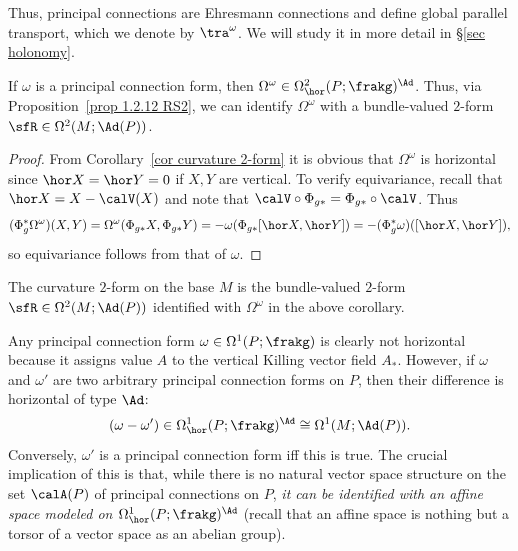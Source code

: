 Thus, principal connections are Ehresmann connections and define global parallel transport, which we denote by $\tra^\omega$. We will study it in more detail in \S\ref{sec holonomy}.


\begin{cor}
    If $\omega$ is a principal connection form, then $\Omega^\omega\in \Omega^2_{\hor}(P;\frakg)^\Ad$. Thus, via Proposition~\ref{prop 1.2.12 RS2}, we can identify $\Omega^\omega$ with a bundle-valued $2$-form $\sfR\in\Omega^2(M;\Ad(P))$.
\end{cor}
\begin{proof}
    From Corollary~\ref{cor curvature 2-form} it is obvious that $\Omega^\omega$ is horizontal since $\hor X=\hor Y=0$ if $X,Y$ are vertical. To verify equivariance, recall that $\hor X=X-\calV(X)$ and note that $\calV\circ \Phi_{g\ast}=\Phi_{g\ast}\circ \calV$. Thus 
    \[(\Phi_{g}^\ast\Omega^\omega)(X,Y)=\Omega^\omega(\Phi_{g\ast}X,\Phi_{g\ast}Y)=-\omega(\Phi_{g\ast}[\hor X,\hor Y])=-(\Phi_{g}^\ast\omega)([\hor X,\hor Y]),\]
    so equivariance follows from that of $\omega$.
\end{proof}

\begin{defn}
    The curvature $2$-form on the base $M$ is the bundle-valued $2$-form $\sfR\in\Omega^2(M;\Ad(P))$ identified with $\Omega^\omega$ in the above corollary.
\end{defn}

\begin{rem}
    Any principal connection form $\omega\in\Omega^1(P;\frakg)$ is clearly not horizontal because it assigns value $A$ to the vertical Killing vector field $A_\ast$. 
    However, if $\omega$ and $\omega'$ are two arbitrary principal connection forms on $P$, then their difference is horizontal of type $\Ad$:
    \[(\omega-\omega')\in \Omega^1_{\hor}(P;\frakg)^\Ad\cong \Omega^1(M;\Ad(P)).\]
    Conversely, $\omega'$ is a principal connection form iff this is true. The crucial implication of this is that, while there is no natural vector space structure on the set $\calA(P)$ of principal connections on $P$, \emph{it can be identified with an affine space modeled on $\Omega^1_{\hor}(P;\frakg)^\Ad$} (recall that an affine space is nothing but a torsor of a vector space as an abelian group).
\end{rem}


